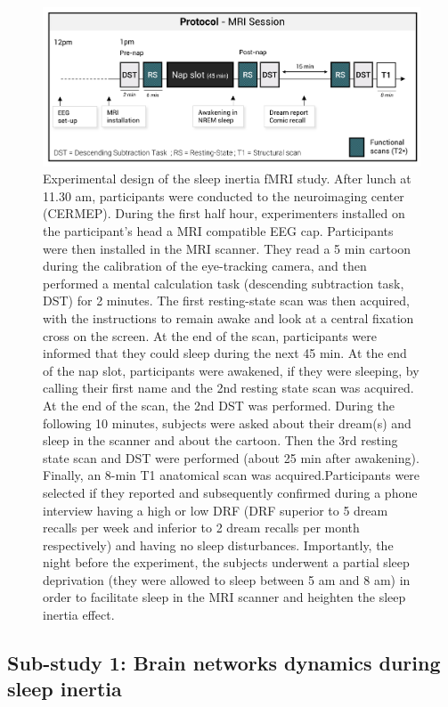 \begin{figure}[htb]
	\includegraphics[width=\textwidth]{Fig/Intro/Intro_paradigm_fMRI/Intro_paradigm_fMRI.png}
	\caption[Experimental design of the fMRI study]{Experimental design of the sleep inertia fMRI study. After lunch at 11.30 am, participants were conducted to the neuroimaging center (CERMEP). During the first half hour, experimenters installed on the participant’s head a MRI compatible EEG cap. Participants were then installed in the MRI scanner. They read a 5 min cartoon during the calibration of the eye-tracking camera, and then performed a mental calculation  task (descending subtraction task, DST) for 2 minutes. The first resting-state scan was then acquired, with the instructions to remain awake and look at a central fixation cross on the screen. At the end of the scan, participants were informed that they could sleep during the next 45 min. At the end of the nap slot, participants were awakened, if they were sleeping, by calling their first name and the 2nd resting state scan was acquired. At the end of the scan, the 2nd DST was performed. During the following 10 minutes, subjects were asked about their dream(s) and sleep in the scanner and about the cartoon. Then the 3rd resting state scan and DST were performed (about 25 min after awakening). Finally, an 8-min T1 anatomical scan was acquired.Participants were selected if they reported and subsequently confirmed during a phone interview having a high or low DRF (DRF superior to 5 dream recalls per week and inferior to 2 dream recalls per month respectively) and having no sleep disturbances. Importantly, the night before the experiment, the subjects underwent a partial sleep deprivation (they were allowed to sleep between 5 am and 8 am) in order to facilitate sleep in the MRI scanner and heighten the sleep inertia effect.}
	\label{fig:intro:problematics-fmri-paradigm}
\end{figure}

\subsection{Sub-study 1: Brain networks dynamics during sleep inertia}
\label{sec:problematic:inertia:overview}


